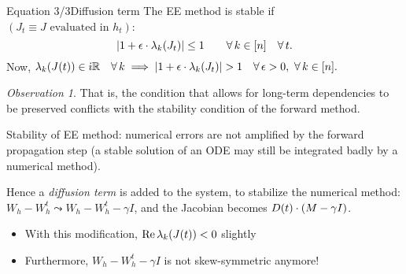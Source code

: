 \documentclass[10pt,xcolor={table,dvipsnames}]{beamer} 		%
\theoremstyle{plain}					%
\theoremstyle{definition}
\theoremstyle{remark}
\newtheorem{oss}{Observation}[section]
\newcommand{\iu}{\dot{\imath}}
\begin{document}
	\begin{frame}{Equation 3/3}{Diffusion term}
		The EE method is 
		\alert{stable} if {\smaller $(J_t\equiv J\text{ evaluated in }h_t)$}:
		\[
			\abs{1+\epsilon\cdot\lambda_k\qty(J_t)}\le 1\qquad\forall\,k\in[n]\quad\forall\,t.
		\]
		Now,
			$\lambda_k\qty(J(t))\in \iu\R\quad\forall\,k\implies\abs{1+\epsilon\cdot\lambda_k\qty(J_t)}>1\quad\forall\,\epsilon>0,\ \forall\,k\in[n].$

		\begin{oss}
			That is, the condition that allows for long-term dependencies to be preserved conflicts with 
			the stability condition of the forward method.
			\smallskip

			Stability of EE method: numerical errors are not amplified by the 
			forward propagation step {\smaller (a stable solution of an ODE may still be integrated 
			badly by a numerical method)}.
		\end{oss}

		Hence a \emph{diffusion term} is added to the system, 
		to stabilize the numerical method:
		$W_h-W_h^t\leadsto W_h-W_h^t-\gamma I$, and the Jacobian becomes $D(t)\cdot\qty(M-\gamma I)$.
		\smallskip 

		\begin{itemize}
			\item With this modification, $\Re\lambda_k\qty(J(t))<0$ slightly 
			\item Furthermore, $W_h-W_h^t-\gamma I$ is not skew-symmetric anymore!
		\end{itemize}
	\end{frame}
\end{document}
